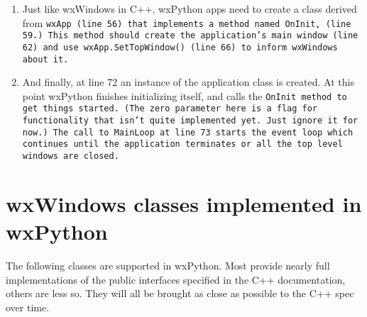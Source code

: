 \begin{enumerate}
\item Just like wxWindows in C++, wxPython apps need to create a class
derived from \tt{wxApp} (line 56) that implements a method named
\tt{OnInit}, (line 59.) This method should create the application's
main window (line 62) and use \tt{wxApp.SetTopWindow()} (line 66) to
inform wxWindows about it.

\item And finally, at line 72 an instance of the application class is
created.  At this point wxPython finishes initializing itself, and calls
the \tt{OnInit} method to get things started.  (The zero parameter here is
a flag for functionality that isn't quite implemented yet.  Just
ignore it for now.)  The call to \tt{MainLoop} at line 73 starts the event
loop which continues until the application terminates or all the top
level windows are closed.

\end{enumerate}



\section{wxWindows classes implemented in wxPython}\label{wxpclasses}

The following classes are supported in wxPython.  Most provide nearly
full implementations of the public interfaces specified in the C++
documentation, others are less so.  They will all be brought as close
as possible to the C++ spec over time.

